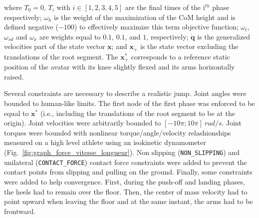 where $T_0=0$, $T_i$ with $i \in [1, 2, 3, 4, 5]$ are the final times of the i$^{th}$ phase respectively; 
$\omega_h$ is the weight of the maximization of the CoM height and is defined negative ($-100$) to effectively maximize this term objective function; 
$\omega_t$, $\omega_{sd}$ and $\omega_x$ are weights equal to $0.1$, $0.1$, and $1$, respectively; 
$\mathbf{\dot{q}}$ is the generalized velocities part of the state vector $\mathbf{x}$; 
and $\mathbf{x}_+$ is the state vector excluding the translations of the root segment. 
The $\mathbf{x}_+^*$ corresponds to a reference static position of the avatar with its knee slightly flexed and its arms horizontally raised.



Several constraints are necessary to describe a realistic jump.
Joint angles were bounded to human-like limits.
The first node of the first phase was enforced to be equal to $\mathbf{x^*}$ (i.e., including the translations of the root segment to be at the origin). 
Joint velocities were arbitrarily bounded to $[-10 \pi; 10 \pi]~rad/s$.
Joint torques were bounded with nonlinear torque/angle/velocity relashionships measured on a high level athlete using an isokinetic dynamometer (Fig.~\ref{fig:graph_force_vitesse_longueur}). 
Non slipping (\texttt{NON\_SLIPPING}) and unilateral (\texttt{CONTACT\_FORCE}) contact force constraints were added to prevent the contact points from slipping and pulling on the ground.
Finally, some constraints were added to help convergence.
First, during the push-off and landing phases, the heels had to remain over the floor.
Then, the center of mass velocity had to point upward when leaving the floor and at the same instant, the arms had to be frontward. 

